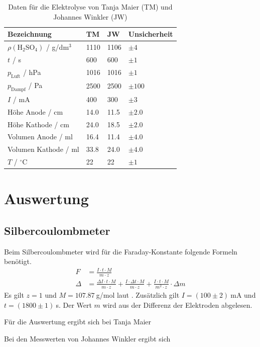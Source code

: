 \documentclass{article}
\begin{document}
\begin{table}[H]
\caption{Daten für die Elektrolyse von Tanja Maier (TM) und Johannes Winkler (JW)}

\begin{tabular}{l|lll}
Bezeichnung & TM & JW & Unsicherheit \\
\hline
$\rho({\text{H}_2\text{SO}_4})$ / g/dm${}^3$ & 1110 & 1106 & $\pm 4$ \\
$t$ / s & 600 & 600 & $\pm 1$ \\
$p_{\text{Luft}}$ / hPa & 1016 & 1016 & $\pm 1$ \\
$p_{\text{Dampf}}$ / Pa & 2500 & 2500 & $\pm 100$ \\
$I$ / mA & 400 & 300 & $\pm 3$ \\
Höhe Anode / cm & 14.0 & 11.5 & $\pm 2.0$ \\
Höhe Kathode / cm & 24.0 & 18.5 & $\pm 2.0$ \\
Volumen Anode / ml & 16.4 & 11.4 & $\pm 4.0$ \\
Volumen Kathode / ml & 33.8 & 24.0 & $\pm 4.0$ \\
$T$ / ${}^\circ$C & 22 & 22 & $\pm 1$
\end{tabular}

\end{table}



\section{Auswertung}

\subsection{Silbercoulombmeter}
Beim Silbercoulombmeter wird für die Faraday-Konstante folgende Formeln benötigt.
\begin{align*}
F &= \frac{I\cdot t\cdot M}{m\cdot z} \\
\Delta &= \frac{\Delta I\cdot t\cdot M}{m\cdot z} + \frac{I\cdot \Delta t\cdot M}{m\cdot z} +\frac{I\cdot t\cdot M}{m^2\cdot z}\cdot \Delta m
\end{align*}
Es gilt $z=1$ und $M=107.87~$g/mol laut \cite{silber}. Zusätzlich gilt $I=(100 \pm 2)~$mA und $t=(1800 \pm 1)~$s. Der Wert $m$ wird aus der Differenz der Elektroden abgelesen.

Für die Auswertung ergibt sich bei Tanja Maier

Bei den Messwerten von Johannes Winkler ergibt sich

\end{document}
